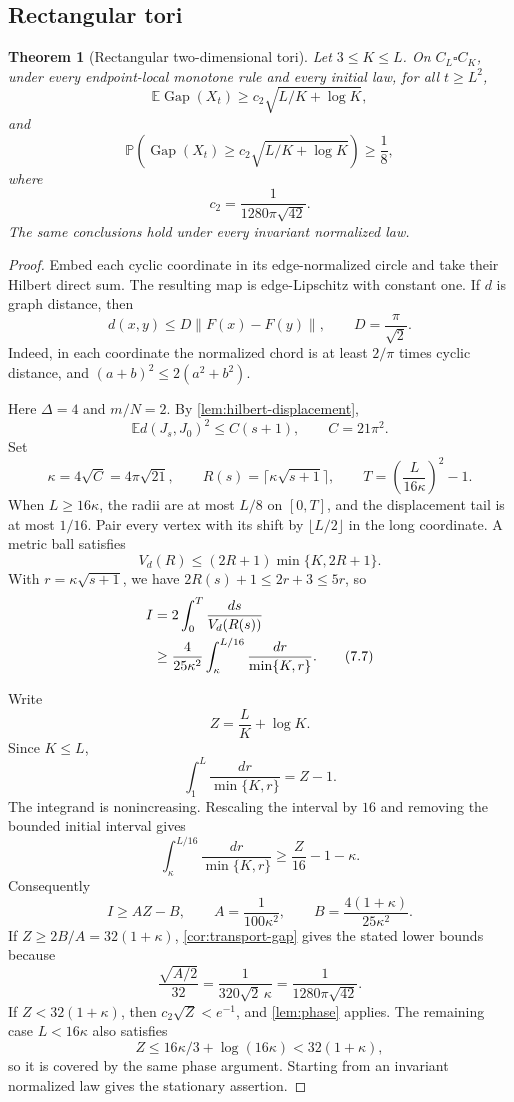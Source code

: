 \documentclass[11pt]{article}
\newtheorem{theorem}{Theorem}[section]
\theoremstyle{remark}
\newcommand{\E}{\mathbb{E}}
\newcommand{\Pp}{\mathbb{P}}
\newcommand{\Gap}{\operatorname{Gap}}
\newcommand{\norm}[1]{\lVert #1\rVert}
\begin{document}
\subsection{Rectangular tori}

\begin{theorem}[Rectangular two-dimensional tori]\label{thm:rectangular-torus}
Let $3\le K\le L$. On $C_L\square C_K$, under every endpoint-local monotone rule and every initial law, for all $t\ge L^2$,
\[
 \E\Gap(X_t)\ge c_2\sqrt{L/K+\log K},
\]
and
\[
 \Pp\!\left(\Gap(X_t)\ge c_2\sqrt{L/K+\log K}\right)\ge\frac18,
\]
where
\[
 c_2=\frac1{1280\pi\sqrt{42}}.
\]
The same conclusions hold under every invariant normalized law.
\end{theorem}

\begin{proof}
Embed each cyclic coordinate in its edge-normalized circle and take their Hilbert direct sum. The resulting map is edge-Lipschitz with constant one. If $d$ is graph distance, then
\[
 d(x,y)\le D\norm{F(x)-F(y)},
 \qquad D=\frac\pi{\sqrt2}.
\]
Indeed, in each coordinate the normalized chord is at least $2/\pi$ times cyclic distance, and $(a+b)^2\le2(a^2+b^2)$.

Here $\Delta=4$ and $m/N=2$. By \cref{lem:hilbert-displacement},
\[
 \E d(J_s,J_0)^2\le C(s+1),
 \qquad C=21\pi^2.
\]
Set
\[
 \kappa=4\sqrt C=4\pi\sqrt{21},
 \qquad
 R(s)=\lceil \kappa\sqrt{s+1}\rceil,
 \qquad
 T=\left(\frac{L}{16\kappa}\right)^2-1.
\]
When $L\ge16\kappa$, the radii are at most $L/8$ on $[0,T]$, and the displacement tail is at most $1/16$. Pair every vertex with its shift by $\lfloor L/2\rfloor$ in the long coordinate. A metric ball satisfies
\[
 V_d(R)\le(2R+1)\min\{K,2R+1\}.
 \tag{7.6}\label{eq:torus-volume}
\]
With $r=\kappa\sqrt{s+1}$, we have $2R(s)+1\le2r+3\le5r$, so
\begin{align}
 I
 &=2\int_0^T\frac{ds}{V_d(R(s))} \notag\\
 &\ge\frac4{25\kappa^2}
 \int_\kappa^{L/16}\frac{dr}{\min\{K,r\}}.
 \tag{7.7}\label{eq:torus-integral}
\end{align}

Write
\[
 Z=\frac LK+\log K.
\]
Since $K\le L$,
\[
 \int_1^L\frac{dr}{\min\{K,r\}}=Z-1.
\]
The integrand is nonincreasing. Rescaling the interval by $16$ and removing the bounded initial interval gives
\[
 \int_\kappa^{L/16}\frac{dr}{\min\{K,r\}}
 \ge\frac{Z}{16}-1-\kappa.
\]
Consequently
\[
 I\ge AZ-B,
 \qquad
 A=\frac1{100\kappa^2},
 \qquad
 B=\frac{4(1+\kappa)}{25\kappa^2}.
\]
If $Z\ge2B/A=32(1+\kappa)$, \cref{cor:transport-gap} gives the stated lower bounds because
\[
 \frac{\sqrt{A/2}}{32}
 =\frac1{320\sqrt2\,\kappa}
 =\frac1{1280\pi\sqrt{42}}.
\]
If $Z<32(1+\kappa)$, then $c_2\sqrt{Z}<e^{-1}$, and \cref{lem:phase} applies. The remaining case $L<16\kappa$ also satisfies
\[
 Z\le16\kappa/3+\log(16\kappa)<32(1+\kappa),
\]
so it is covered by the same phase argument. Starting from an invariant normalized law gives the stationary assertion.
\end{proof}
\end{document}
